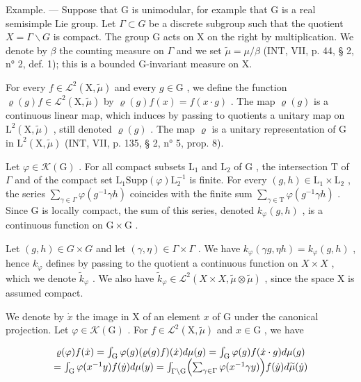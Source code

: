 Example. --- Suppose that G is unimodular, for example that G is a real semisimple Lie group. Let \(\Gamma \subset G\) be a discrete subgroup such that the quotient \(X = \Gamma \backslash G\) is compact. The group G acts on X on the right by multiplication. We denote by \(\beta\) the counting measure on \(\Gamma\) and we set \(\widetilde{\mu} = \mu / \beta\) (INT, VII, p. 44, § 2, n° 2, def. 1); this is a bounded G-invariant measure on X.

For every \(f \in \mathcal{L}^2(\mathrm{X},\widetilde{\mu})\) and every \(g \in \mathrm{G}\) , we define the function \(\varrho(g)f \in \mathcal{L}^2(\mathrm{X},\widetilde{\mu})\) by \(\varrho(g)f(x) = f(x \cdot g)\) . The map \(\varrho(g)\) is a continuous linear map, which induces by passing to quotients a unitary map on \(\mathrm{L}^2(\mathrm{X},\widetilde{\mu})\) , still denoted \(\varrho(g)\) . The map \(\varrho\) is a unitary representation of G in \(\mathrm{L}^2(\mathrm{X},\widetilde{\mu})\) (INT, VII, p. 135, § 2, n° 5, prop. 8).

Let \(\varphi \in \mathcal{K}(\mathrm{G})\) . For all compact subsets \(\mathrm{L}_1\) and \(\mathrm{L}_2\) of \(\mathrm{G}\) , the intersection \(\mathrm{T}\) of \(\Gamma\) and of the compact set \(\mathrm{L}_1\mathrm{Supp}(\varphi)\mathrm{L}_2^{-1}\) is finite. For every \((g,h) \in \mathrm{L}_1 \times \mathrm{L}_2\) , the series \(\sum_{\gamma \in \Gamma} \varphi(g^{-1}\gamma h)\) coincides with the finite sum \(\sum_{\gamma \in \mathrm{T}} \varphi(g^{-1}\gamma h)\) . Since \(\mathrm{G}\) is locally compact, the sum of this series, denoted \(k_{\varphi}(g,h)\) , is a continuous function on \(\mathrm{G} \times \mathrm{G}\) .

Let \((g,h) \in G \times G\) and let \((\gamma, \eta) \in \Gamma \times \Gamma\) . We have \(k_{\varphi}(\gamma g, \eta h) = k_{\varphi}(g, h)\) , hence \(k_{\varphi}\) defines by passing to the quotient a continuous function on \(X \times X\) , which we denote \(\widetilde{k}_{\varphi}\) . We also have \(\widetilde{k}_{\varphi} \in \mathcal{L}^{2}(X \times X, \widetilde{\mu} \otimes \widetilde{\mu})\) , since the space X is assumed compact.

We denote by \(\dot{x}\) the image in X of an element \(x\) of G under the canonical projection. Let \(\varphi \in \mathcal{K}(\mathrm{G})\) . For \(f \in \mathcal{L}^2(\mathrm{X},\widetilde{\mu})\) and \(x \in \mathrm{G}\) , we have

\[
\begin{array}{c} \varrho (\varphi) f (\dot {x}) = \int_ {\mathrm{G}} \varphi (g)   (\varrho (g) f) (\dot {x}) d \mu (g) = \int_ {\mathrm{G}} \varphi (g) f (\dot {x} \cdot g) d \mu (g) \\ = \int_ {\mathrm{G}} \varphi (x ^ {- 1} y) f (\dot {y}) d \mu (y) = \int_ {\Gamma \backslash \mathrm{G}} \Bigl (\sum_ {\gamma \in \Gamma} \varphi (x ^ {- 1} \gamma y) \Bigr) f (\dot {y}) d \widetilde {\mu} (\dot {y}) \end{array}
\]

